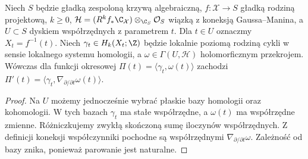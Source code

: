 \begin{stwierdzenie}
\label{prop:xv-period-derivative}
Niech $S$ będzie gładką zespoloną krzywą algebraiczną,
$f:\mathcal X\to S$ gładką rodziną projektową, $k\ge0$,
$\mathcal H=(R^kf_*\C_{\mathcal X})\otimes_{\C_S}\mathcal O_S$
wiązką z koneksją Gaussa--Manina,
a $U\subset S$ dyskiem współrzędnych z parametrem $t$.
Dla $t\in U$ oznaczmy $X_t=f^{-1}(t)$.
Niech $\gamma_t\in H_k(X_t;\Z)$ będzie
lokalnie poziomą rodziną cykli w sensie lokalnego
systemu homologii, a
$\omega\in\Gamma(U,\mathcal H)$ holomorficznym przekrojem.
Wówczas dla funkcji okresowej
$\Pi(t)=\langle\gamma_t,\omega(t)\rangle$
zachodzi
$\Pi'(t)=\langle\gamma_t,\nabla_{\partial/\partial t}\omega(t)\rangle$.
\end{stwierdzenie}
\begin{proof}
Na $U$ możemy jednocześnie wybrać płaskie bazy homologii
oraz kohomologii. W tych bazach $\gamma_t$ ma stałe
współrzędne, a $\omega(t)$ ma współrzędne zmienne.
Różniczkujemy zwykłą skończoną sumę iloczynów współrzędnych.
Z definicji koneksji współczynniki pochodne są współrzędnymi
$\nabla_{\partial/\partial t}\omega$. Zależność od bazy
znika, ponieważ parowanie jest naturalne.
\end{proof}

